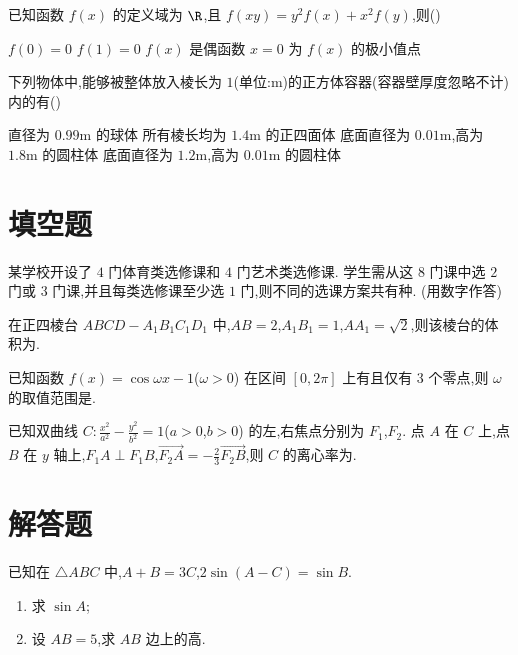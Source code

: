 \begin{problem}
已知函数 \(f(x)\) 的定义域为 \(\R\),且 \(f(xy)=y^2f(x)+x^2f(y)\),则(\quad)

\choices
    {\(f(0)=0\)}
    {\(f(1)=0\)}
    {\(f(x)\) 是偶函数}
    {\(x=0\) 为 \(f(x)\) 的极小值点}
\end{problem}

\begin{problem}
下列物体中,能够被整体放入棱长为 \(1\)(单位:m)的正方体容器(容器壁厚度忽略不计)内的有(\quad)

\choices
    {直径为 \(0.99\text{m}\) 的球体}
    {所有棱长均为 \(1.4\text{m}\) 的正四面体}
    {底面直径为 \(0.01\text{m}\),高为 \(1.8\text{m}\) 的圆柱体}
    {底面直径为 \(1.2\text{m}\),高为 \(0.01\text{m}\) 的圆柱体}
\end{problem}

\section{填空题}

\begin{problem}
某学校开设了 \(4\) 门体育类选修课和 \(4\) 门艺术类选修课. 学生需从这 \(8\) 门课中选 \(2\) 门或 \(3\) 门课,并且每类选修课至少选 \(1\) 门,则不同的选课方案共有\fillinblank{}种. (用数字作答)
\end{problem}

\begin{problem}
在正四棱台 \(ABCD-A_1B_1C_1D_1\) 中,\(AB=2\),\(A_1B_1=1\),\(AA_1=\sqrt2\),则该棱台的体积为\fillinblank{}.
\end{problem}

\begin{problem}
已知函数 \(f(x)=\cos\omega x-1\)(\(\omega>0\)) 在区间 \([0,2\pi]\) 上有且仅有 \(3\) 个零点,则 \(\omega\) 的取值范围是\fillinblank{}.
\end{problem}

\begin{problem}
已知双曲线 \(C:\frac{x^2}{a^2}-\frac{y^2}{b^2}=1\)(\(a>0\),\(b>0\)) 的左,右焦点分别为 \(F_1\),\(F_2\). 点 \(A\) 在 \(C\) 上,点 \(B\) 在 \(y\) 轴上,\(F_1A\perp F_1B\),\(\overrightarrow{F_2A}=-\frac23\overrightarrow{F_2B}\),则 \(C\) 的离心率为\fillinblank{}.
\end{problem}

\section{解答题}

\begin{problem}
已知在 \(\triangle ABC\) 中,\(A+B=3C\),\(2\sin(A-C)=\sin B\).
\begin{enumerate}
\item 求 \(\sin A\);
\item 设 \(AB=5\),求 \(AB\) 边上的高.
\end{enumerate}
\end{problem}

